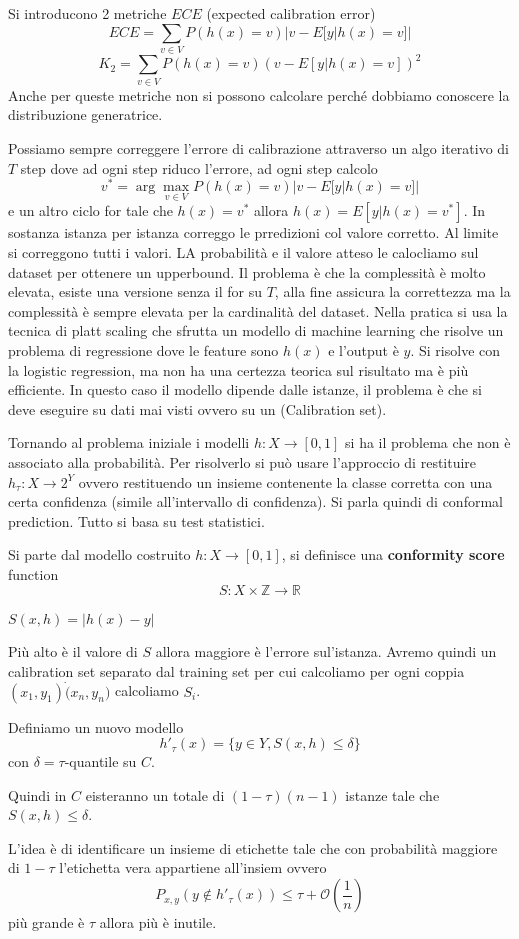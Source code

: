 Si introducono 2 metriche $ECE$ (expected calibration error) 
$$ECE = \sum_{v\in V}P(h(x)=v)|v-E[y|h(x)=v]|$$
$$K_2 = \sum_{v\in V}P(h(x)=v)(v-E[y|h(x)=v])^2$$
Anche per queste metriche non si possono calcolare perché dobbiamo conoscere la distribuzione generatrice.

Possiamo sempre correggere l'errore di calibrazione attraverso un algo iterativo di $T$ step dove ad ogni step 
riduco l'errore, ad ogni step calcolo 
$$v^\ast = \arg\max_{v\in V}P(h(x)=v)|v-E[y|h(x)=v]|$$ 
e un altro ciclo for tale che $h(x)=v^\ast $ allora $h(x)=E[y|h(x)=v^\ast]$. 
In sostanza istanza per istanza correggo le prredizioni col valore corretto. Al limite si correggono tutti i valori.
LA probabilità e il valore atteso le calocliamo sul dataset per ottenere un upperbound. Il problema è che 
la complessità è molto elevata, esiste una versione senza il for su $T$, alla fine assicura la correttezza 
ma la complessità è sempre elevata per la cardinalità del dataset. Nella pratica si usa la tecnica 
di platt scaling che sfrutta un modello di machine learning che risolve un problema di regressione 
dove le feature sono $h(x)$ e l'output è $y$. Si risolve con la logistic regression,
ma non ha una certezza teorica sul risultato ma è più efficiente.
In questo caso il modello dipende dalle istanze, il problema è che si deve eseguire 
su dati mai visti ovvero su un (Calibration set).

Tornando al problema iniziale i modelli $h:X\to [0,1]$  si ha il problema che non 
è associato alla probabilità. Per risolverlo si può usare l'approccio di 
restituire $h_\tau :X\to 2^Y$ ovvero restituendo un insieme contenente la classe 
corretta con una certa confidenza (simile all'intervallo di confidenza). Si parla 
quindi di conformal prediction. Tutto si basa su test statistici.

Si parte dal modello costruito $h:X\to [0,1]$, si definisce una \textbf{conformity score}
function 
$$S:X\times \mathbb{Z} \to \mathbb{R}$$
\begin{esempio}
    $S(x,h) = |h(x)-y|$
\end{esempio}
Più alto è il valore di $S$ allora maggiore è l'errore sul'istanza. Avremo 
quindi un calibration set separato dal training set per cui calcoliamo per ogni
coppia $(x_1,y_1)\dot(x_n,y_n)$ calcoliamo $S_i$.

Definiamo un nuovo modello 
$$h'_\tau(x)=\{y\in Y, S(x,h)\le \delta\}$$
con $\delta = \tau$-quantile su $C$. 

Quindi in $C$ eisteranno un totale di $(1-\tau)(n-1)$ istanze tale che $S(x,h)\le \delta$.

L'idea è di identificare un insieme di etichette tale che con probabilità maggiore
di $1-\tau$ l'etichetta vera appartiene all'insiem ovvero 
$$P_{x,y}(y\not \in h'_\tau(x))\le \tau + \mathcal{O}(\frac{1}{n})$$
più grande è $\tau$ allora più è inutile.

